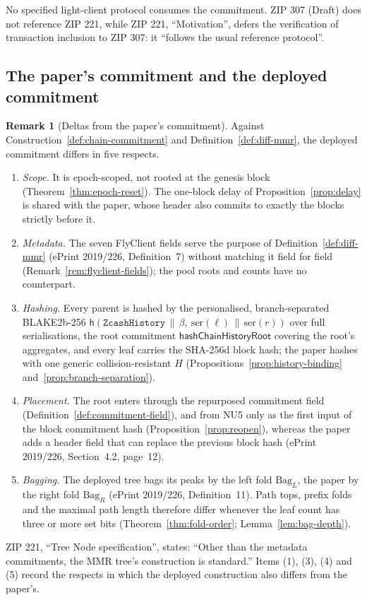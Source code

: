 \documentclass[11pt,a4paper]{article}
\theoremstyle{definition}
\newtheorem{remark}[theorem]{Remark}
\begin{document}
No specified light-client protocol consumes the commitment. ZIP 307 (Draft)
does not reference ZIP 221, while ZIP 221, ``Motivation'', defers the
verification of transaction inclusion to ZIP 307: it ``follows the usual
reference protocol''.

\subsection{The paper's commitment and the deployed commitment}
\label{sec:boundary-deltas}

\begin{remark}[Deltas from the paper's commitment]\label{rem:deltas}
Against Construction~\ref{def:chain-commitment} and
Definition~\ref{def:diff-mmr}, the deployed commitment differs in five
respects.
\begin{enumerate}[label=(\arabic*)]
\item \emph{Scope.} It is epoch-scoped, not rooted at the genesis block
  (Theorem~\ref{thm:epoch-reset}). The one-block delay of
  Proposition~\ref{prop:delay} is shared with the paper, whose header also
  commits to exactly the blocks strictly before it.
\item \emph{Metadata.} The seven FlyClient fields serve the purpose of
  Definition~\ref{def:diff-mmr} (ePrint 2019/226, Definition~7) without
  matching it field for field (Remark~\ref{rem:flyclient-fields}); the pool
  roots and counts have no counterpart.
\item \emph{Hashing.} Every parent is hashed by the personalised,
  branch-separated BLAKE2b-256
  $\mathsf{h}(\texttt{ZcashHistory} \,\|\, \beta,\ \mathrm{ser}(\ell) \,\|\,
  \mathrm{ser}(r))$ over full serialisations, the root commitment
  $\mathsf{hashChainHistoryRoot}$ covering the root's aggregates, and every
  leaf carries the SHA-256d block hash; the paper hashes with one generic
  collision-resistant $H$ (Propositions~\ref{prop:history-binding}
  and~\ref{prop:branch-separation}).
\item \emph{Placement.} The root enters through the repurposed commitment
  field (Definition~\ref{def:commitment-field}), and from NU5 only as the
  first input of the block commitment hash (Proposition~\ref{prop:reopen}),
  whereas the paper adds a header field that can replace the previous block
  hash (ePrint 2019/226, Section~4.2, page~12).
\item \emph{Bagging.} The deployed tree bags its peaks by the left fold
  $\mathrm{Bag}_L$, the paper by the right fold $\mathrm{Bag}_R$
  (ePrint 2019/226, Definition~11). Path tops, prefix folds and the maximal
  path length therefore differ whenever the leaf count has three or more set
  bits (Theorem~\ref{thm:fold-order}; Lemma~\ref{lem:bag-depth}).
\end{enumerate}
ZIP 221, ``Tree Node specification'', states: ``Other than the metadata
commitments, the MMR tree's construction is standard.'' Items (1), (3),
(4) and (5) record the respects in which the deployed construction also
differs from the paper's.
\end{remark}
\end{document}
